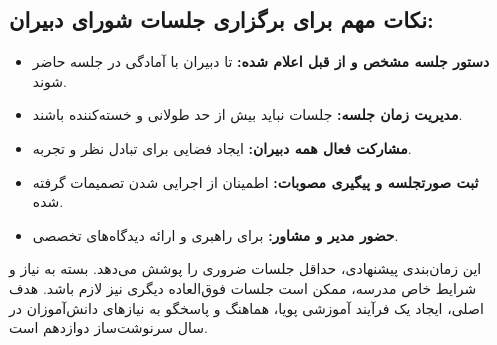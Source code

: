 \documentclass[a4paper]{article}
\begin{document}
\subsection*{نکات مهم برای برگزاری جلسات شورای دبیران:}
\begin{itemize}
    \item \textbf{دستور جلسه مشخص و از قبل اعلام شده:} تا دبیران با آمادگی در جلسه حاضر شوند.
    \item \textbf{مدیریت زمان جلسه:} جلسات نباید بیش از حد طولانی و خسته‌کننده باشند.
    \item \textbf{مشارکت فعال همه دبیران:} ایجاد فضایی برای تبادل نظر و تجربه.
    \item \textbf{ثبت صورتجلسه و پیگیری مصوبات:} اطمینان از اجرایی شدن تصمیمات گرفته شده.
    \item \textbf{حضور مدیر و مشاور:} برای راهبری و ارائه دیدگاه‌های تخصصی.
\end{itemize}
\medskip
این زمان‌بندی پیشنهادی، حداقل جلسات ضروری را پوشش می‌دهد. بسته به نیاز و شرایط خاص مدرسه، ممکن است جلسات فوق‌العاده دیگری نیز لازم باشد. هدف اصلی، ایجاد یک فرآیند آموزشی پویا، هماهنگ و پاسخگو به نیازهای دانش‌آموزان در سال سرنوشت‌ساز دوازدهم است.
\end{document}
